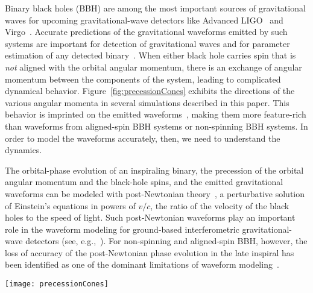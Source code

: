 \documentclass[aps,prd,amsmath,floatfix,twocolumn,superscriptaddress,nofootinbib,showpacs]{revtex4-1}
\newcommand{\ellHat}{\ensuremath{\hat{\ell}}}
\begin{document}
Binary black holes (BBH) are among the most important sources of
gravitational waves for upcoming gravitational-wave detectors like
Advanced LIGO~\cite{TheLIGOScientific:2014jea} and
Virgo~\cite{Accadia:2011zzc}.  Accurate predictions of the
gravitational waveforms emitted by such systems are important for
detection of gravitational waves and for parameter estimation of any
detected binary~\cite{Abbott:2007}.  When either black hole carries
spin that is \emph{not} aligned with the orbital angular momentum,
there is an exchange of angular momentum between the components of the
system, leading to complicated dynamical behavior.
Figure~\ref{fig:precessionCones} exhibits the directions of the
various angular momenta in several simulations described in this
paper.  This behavior is imprinted on the emitted
waveforms~\cite{Apostolatos1994, PekowskyEtAl:2013, BoyleEtAl:2014},
making them more feature-rich than waveforms from aligned-spin BBH
systems or non-spinning BBH systems.  In order to model the waveforms
accurately, then, we need to understand the dynamics.

The orbital-phase evolution of an inspiraling binary, the precession
of the orbital angular momentum and the black-hole spins, and the
emitted gravitational waveforms can be modeled with post-Newtonian
theory~\cite{lrr-2014-2}, a perturbative solution of Einstein's
equations in powers of $v/c$, the ratio of the velocity of the black
holes to the speed of light.  Such post-Newtonian waveforms play an
important role in the waveform modeling for ground-based
interferometric gravitational-wave detectors (see,
e.g.,~\cite{Ohme:2011rm}).  For non-spinning and aligned-spin BBH,
however, the loss of accuracy of the post-Newtonian phase evolution in
the late inspiral has been identified as one of the dominant
limitations of waveform modeling~\cite{Damour:2010, Boyle:2011dy,
  OhmeEtAl:2011, MacDonald:2011ne, MacDonald:2012mp, Nitz:2013mxa}.


\begin{figure*}
\texttt{[image: precessionCones]}
\caption{Precession cones of the six primary precessing simulations
  considered here, as computed by NR and PN.  Shown are the paths
  traced on the unit sphere by the normal to the orbital plane
  $\ellHat$ and the spin-directions $\hat{\chi}_{1,2}$. The thick
  lines represent the NR data, with the filled circles indicating the
  start of the NR simulations.  The lines connecting the NR data to
  the origin are drawn to help visualize the precession-cones.  The PN
  data, plotted with thin lines, lie on the scale of this figure
  almost precisely on top of the NR data.  (The PN data was
  constructed using the Taylor T4 approximant matched at frequency
  $m\Omega_m=0.021067$, with a matching interval width
  $\delta\Omega=0.1\Omega_m$.) }
  \label{fig:precessionCones}
\end{figure*}
\end{document}
